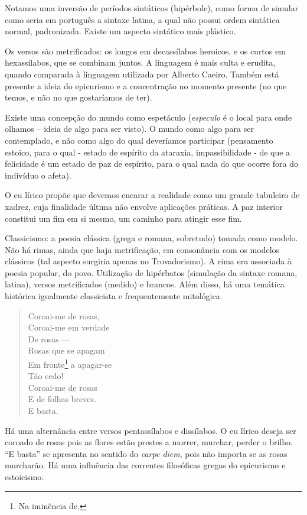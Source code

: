 Notamos uma inversão de períodos sintáticos (hipérbole), como forma de simular como seria em português a sintaxe latina, a qual não possui ordem sintática normal, padronizada. Existe um aspecto sintático mais plástico.

Os versos são metrificados: os longos em decassílabos heroicos, e os curtos em hexassílabos, que se combinam juntos. A linguagem é mais culta e erudita, quando comparada à linguagem utilizada por Alberto Caeiro. Também está presente a ideia do epicurismo e a concentração no momento presente (no que temos, e não no que gostaríamos de ter).

Existe uma concepção do mundo como espetáculo (\textit{especulo} é o local para onde olhamos -- ideia de algo para ser visto). O mundo como algo para ser contemplado, e não como algo do qual deveríamos participar (pensamento estoico, para o qual - estado de espírito da ataraxia, impassibilidade - de que a felicidade é um estado de paz de espírito, para o qual nada do que ocorre fora do indivíduo o afeta).

O eu lírico propõe que devemos encarar a realidade como um grande tabuleiro de xadrez, cuja finalidade última não envolve aplicações práticas. A paz interior constitui um fim em si mesmo, um caminho para atingir esse fim.

Classicismo: a poesia clássica (grega e romana, sobretudo) tomada como modelo. Não há rimas, ainda que haja metrificação, em consonância com os modelos clássicos (tal aspecto surgiria apenas no Trovadorismo). A rima era associada à poesia popular, do povo. Utilização de hipérbatos (simulação da sintaxe romana, latina), versos metrificados (medido) e brancos. Além disso, há uma temática histórica igualmente classicista e frequentemente mitológica.

\begin{verse}
Coroai-me de rosas, \\
Coroai-me em verdade \\
De rosas — \\
Rosas que se apagam \\
Em fronte\footnote{Na iminência de.} a apagar-se \\
Tão cedo! \\
Coroai-me de rosas \\
E de folhas breves. \\
E basta.
\end{verse}

Há uma alternância entre versos pentassílabos e dissílabos. O eu lírico deseja ser coroado de rosas pois as flores estão prestes a morrer, murchar, perder o brilho. ``E basta'' se apresenta no sentido do \textit{carpe diem}, pois não importa se as rosas murcharão. Há uma influência das correntes filosóficas gregas do epicurismo e estoicismo.